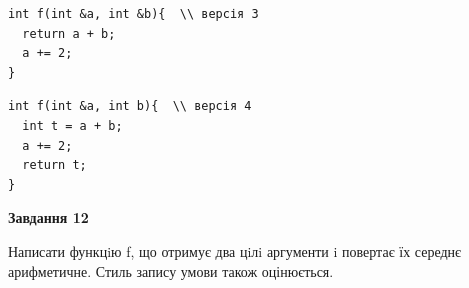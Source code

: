 \documentclass[12pt, ukrainian]{article}
\begin{document}
{\begin {large}
\begin{minipage}[t]{11.0cm}
\vspace{-8mm}\begin{verbatim}
int f(int &a, int &b){  \\ версія 3
  return a + b;
  a += 2;
}
\end{verbatim}

\vspace{-8mm}\begin{verbatim}
int f(int &a, int b){  \\ версія 4
  int t = a + b;
  a += 2;
  return t;
}
\end{verbatim}



\begin{center}
\textbf{Завдання 12}
\end{center}

Написати функцiю f, що отримує два цiлi аргументи i повертає їх середнє арифметичне. Стиль запису умови також оцінюється.\par

\end{minipage}

\end {large}}
\newpage
\end{document}
